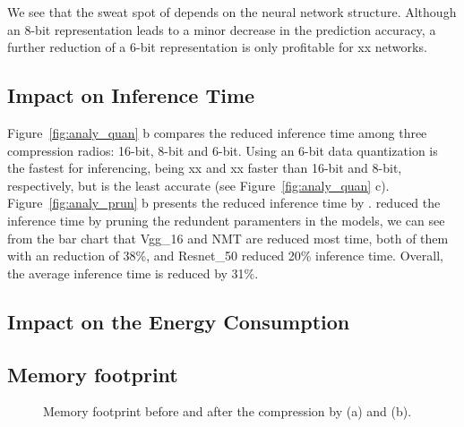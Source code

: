 We see that the sweat spot of \quantization depends on the neural network structure. Although an 8-bit representation leads to a minor
decrease in the prediction accuracy, a further reduction of a 6-bit representation is only profitable for xx networks.

\subsection{Impact on Inference Time}
Figure~\ref{fig:analy_quan} b compares the reduced inference time
among three compression radios: 16-bit, 8-bit and 6-bit. 
Using an 6-bit data quantization is the fastest for inferencing,
being xx and xx faster than 16-bit and 8-bit, respectively, 
but is the least accurate (see Figure~\ref{fig:analy_quan} c). 
Figure~\ref{fig:analy_prun} b presents the reduced inference time by \pruning.
\pruning reduced the inference time by pruning the redundent paramenters in the models,
we can see from the bar chart that
Vgg\_16 and NMT are reduced most time, both of them with an reduction of 38\%, and 
Resnet\_50 reduced 20\% inference time. Overall, the average inference time is reduced by 31\%.


\subsection{Impact on the Energy Consumption}


\subsection{Memory footprint}

\begin{figure}[!t]
\centering
{}
\hfill
{}
\hfill

\caption{Memory footprint before and after the compression by \quantization(a) and \pruning (b).}
\label{fig:footprint}
\end{figure}
